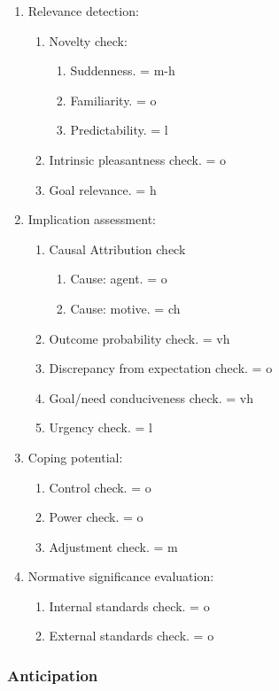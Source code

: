 \begin{enumerate}
\item  Relevance detection:
\begin{enumerate}
\item  Novelty check:
\begin{enumerate}
\item  Suddenness. = m-h
\item  Familiarity. = o
\item  Predictability. = l
\end{enumerate}
\item  Intrinsic pleasantness check. = o
\item  Goal relevance. = h
\end{enumerate}
\item  Implication assessment:
\begin{enumerate}
\item  Causal Attribution check
\begin{enumerate}
\item  Cause: agent. = o
\item  Cause: motive. = ch
\end{enumerate}
\item  Outcome probability check. = vh
\item  Discrepancy from expectation check. = o
\item  Goal/need conduciveness check. = vh
\item  Urgency check. = l
\end{enumerate}
\item  Coping potential:
\begin{enumerate}
\item  Control check. = o
\item  Power check. = o
\item  Adjustment check. = m
\end{enumerate}
\item  Normative significance evaluation:
\begin{enumerate}
\item  Internal standards check. = o
\item  External standards check. = o
\end{enumerate}
\end{enumerate}

\subsubsection{Anticipation}

